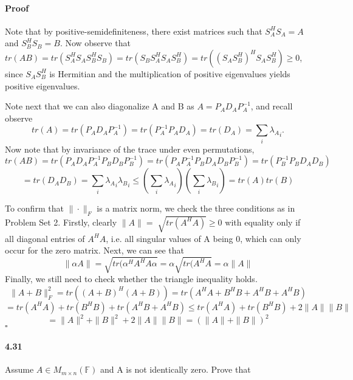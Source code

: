 \documentclass[letterpaper,12pt]{article}
\theoremstyle{definition}
\begin{document}
\paragraph{Proof} Note that by positive-semidefiniteness, there exist matrices such that $S_A^HS_A = A$ and $S_B^HS_B = B$. Now observe that $tr(AB) = tr(S_A^HS_AS_B^HS_B)
= tr(S_BS_A^HS_AS_B^H) 
= tr((S_AS_B^H)^HS_AS_B^H) \ge 0$, since $S_AS_B^H$ is Hermitian and the multiplication of positive eigenvalues yields positive eigenvalues.

Note next that we can also diagonalize A and B as $A = P_A D_A P_A^{-1}$, and recall observe $$tr(A) =  tr(P_A D_A P_A^{-1}) = tr(P_A^{-1} P_A D_A ) = tr(D_A) = \sum_i {\lambda_A}_i.$$
Now note that by invariance of the trace under even permutations,  $$tr(AB) = tr(P_A D_A P_A^{-1} P_B D_B P_B^{-1})
= tr(P_A P_A^{-1} P_B D_A D_B P_B^{-1})
= tr(P_B^{-1} P_B D_A D_B )$$
$$= tr(D_A D_B ) = \sum_i {\lambda_A}_i {\lambda_B}_i \le (\sum_i {\lambda_A}_i)(\sum_i {\lambda_B}_i) = tr(A)tr(B)$$

To confirm that $\| \cdot \|_F$ is a matrix norm, we check the three conditions as in Problem Set 2.
Firstly, clearly $\| A \| = \sqrt[]{tr(A^HA)} \ge 0$ with equality only if all diagonal entries of $A^HA$, i.e. all singular values of A being 0, which can only occur for the zero matrix. Next, we can see that $$\|\alpha A \| = \sqrt{tr(\alpha^H A^H A \alpha} = \alpha \sqrt{tr( A^H A } = \alpha \| A \|$$
Finally, we still need to check whether the triangle inequality holds. 
$$\| A + B \|_F^2 = tr((A+B)^H(A+B)) 
= tr(A^HA+B^HB + A^HB+A^HB)  $$
$$= tr(A^HA) + tr(B^HB) + tr(A^HB+A^HB)
\le tr(A^HA) + tr(B^HB) +2\|A\|\|B\| $$
$$ = \|A\|^2 + \|B\|^2 +2\|A\|\|B\| = (\|A\| + \|B\|)^2$$ $\square$

   
\paragraph{4.31} Assume $A \in M_{m \times n}(\mathbb{F})$ and  A is not identically zero. Prove that
\end{document}
